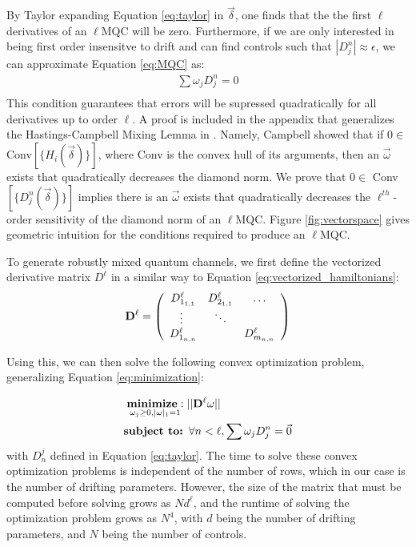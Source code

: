 \documentclass[aps,nofootinbib,pra,notitlepage,twocolumn]{revtex4-1}
\begin{document}
By Taylor expanding Equation \ref{eq:taylor} in $\vec{\delta}$, one finds that the the first $\ell$ derivatives of an $\ell$MQC will be zero. Furthermore, if we are only interested in being first order insensitve to drift and can find controls such that $|D_j^n|\approx\epsilon$, we can approximate Equation \ref{eq:MQC} as:
\begin{equation}\label{eq:MQC-relaxed}
\begin{gathered}
\sum\omega_jD^n_j = 0\\
\end{gathered}
\end{equation}
This condition guarantees that errors will be supressed quadratically for all derivatives up to order $\ell$. A proof is included in the appendix that generalizes the Hastings-Campbell Mixing Lemma in \cite{Campbell2017}. Namely, Campbell showed that if $0\in $ Conv$[\{H_i(\vec{\delta})\}]$, where Conv is the convex hull of its arguments, then an $\vec{\omega}$ exists that quadratically decreases the diamond norm. We prove that $0\in $ Conv$[\{D_j^n(\vec{\delta})\}]$ implies there is an $\vec{\omega}$ exists that quadratically decreases the $\ell^{th}$-order sensitivity of the diamond norm of an $\ell$MQC. Figure \ref{fig:vectorspace} gives geometric intuition for the conditions required to produce an $\ell$MQC.

To generate robustly mixed quantum channels, we first define the vectorized derivative matrix ${D^{\ell}}$ in a similar way to Equation \ref{eq:vectorized_hamiltonians}:
\begin{equation}
{\bold{D}^{\ell}} =  \left(\begin{array}{cccc}
		D^\ell_{1_{1,1}} & D^\ell_{2_{1,1}} & \ldots   \\ 
		\vdots\ & \ddots &    \\
		D^\ell_{1_{n,n}} &  &  D^\ell_{m_{n,n}} \\ 
	\end{array} 	
	\right)
\end{equation}

Using this, we can then solve the following convex optimization problem, generalizing Equation \ref{eq:minimization}:

\begin{equation}\label{eq:robust_minimization}
  \begin{split}
    &\underset{\omega_j\geq0, |\omega|_1=1}{\textbf{minimize}: } ||{\bold{D}^{\ell}}\omega||\\
    &\textbf{subject to: } \forall n<\ell, \sum \omega_jD_j^n=\vec{0}\\
  \end{split}
\end{equation}
with $D_n^j$ defined in Equation \ref{eq:taylor}. The time to solve these convex optimization problems is independent of the number of rows, which in our case is the number of drifting parameters. However, the size of the matrix that must be computed before solving grows as $Nd^{\ell}$, and the runtime of solving the optimization problem grows as $N^4$, with $d$ being the number of drifting parameters, and $N$ being the number of controls.
\end{document}
